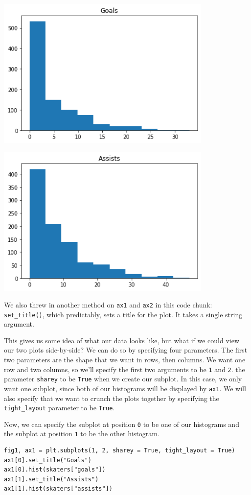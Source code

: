 \includegraphics[width = 0.8\textwidth]{img/hist1.png}

\includegraphics[width = 0.8\textwidth]{img/hist2.png}

We also threw in another method on \verb|ax1| and \verb|ax2| in this code chunk: \verb|set_title()|, which predictably, sets a title for the plot. It takes a single string argument.

This gives us some idea of what our data looks like, but what if we could view our two plots side-by-side? We can do so by specifying four parameters. The first two parameters are the shape that we want in rows, then columns. We want one row and two columns, so we'll specify the first two arguments to be \verb|1| and \verb|2|. the parameter \verb|sharey| to be \verb|True| when we create our subplot. In this case, we only want one subplot, since both of our histograms will be displayed by \verb|ax1|. We will also specify that we want to crunch the plots together by specifying the \verb|tight_layout| parameter to be \verb|True|.\par
Now, we can specify the subplot at position \verb|0| to be one of our histograms and the subplot at position \verb|1| to be the other histogram.
\begin{lstlisting}[style=pippython]
fig1, ax1 = plt.subplots(1, 2, sharey = True, tight_layout = True)
ax1[0].set_title("Goals")
ax1[0].hist(skaters["goals"])
ax1[1].set_title("Assists")
ax1[1].hist(skaters["assists"])
\end{lstlisting}

